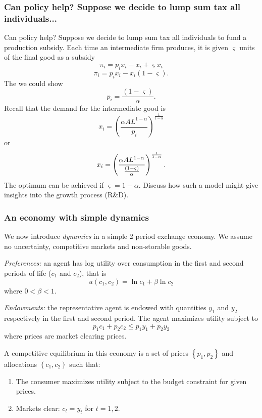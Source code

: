 \documentclass[aspectratio=169]{ltx-talk}
\begin{document}
\begin{frame}
\frametitle{Can policy help? Suppose we decide to lump sum tax all individuals...}
Can policy help? Suppose we decide to lump sum tax all individuals to fund a
production subsidy. Each time an intermediate firm produces, it is given $%
\varsigma $ units of the final good as a subsidy 
\begin{equation*}
\pi _{i}=p_{i}x_{i}-x_{i}+\varsigma x_{i}
\end{equation*}%
\begin{equation*}
\pi _{i}=p_{i}x_{i}-x_{i}\left( 1-\varsigma \right) .
\end{equation*}%
The we could show 
\begin{equation*}
p_{i}=\frac{\left( 1-\varsigma \right) }{\alpha }.
\end{equation*}%
Recall that the demand for the intermediate good is 
\begin{equation*}
x_{i}=\left( \frac{\alpha AL^{1-\alpha }}{p_{i}}\right) ^{\frac{1}{1-\alpha }%
}
\end{equation*}%
or%
\begin{equation*}
x_{i}=\left( \frac{\alpha AL^{1-\alpha }}{\frac{\left( 1-\varsigma \right) }{%
\alpha }}\right) ^{\frac{1}{1-\alpha }}.
\end{equation*}%
The optimum can be achieved if $\varsigma =1-\alpha .$ Discuss how such a
model might give insights into the growth process (R\&D).
\end{frame}

\begin{frame}
\frametitle{An economy with simple dynamics}
We now introduce \textit{dynamics} in a simple 2 period exchange economy. We
assume no uncertainty, competitive markets and non-storable goods.

\textit{Preferences: }an agent has log utility over consumption in the first
and second periods of life ($c_{1}$ and $c_{2}$), that is 
\begin{equation*}
u\left( c_{1},c_{2}\right) =\ln c_{1}+\beta \ln c_{2}
\end{equation*}%
where $0<\beta <1.$

\textit{Endowments:} the representative agent is endowed with quantities $%
y_{1}$ and $y_{2}$ respectively in the first and second period. The agent
maximizes utility subject to%
\begin{equation*}
p_{1}c_{1}+p_{2}c_{2}\leq p_{1}y_{1}+p_{2}y_{2}
\end{equation*}%
where prices are market clearing prices.

A competitive equilibrium in this economy is a set of prices $\left\{
p_{1},p_{2}\right\} $ and allocations $\left\{ c_{1},c_{2}\right\} $ such
that:

\begin{enumerate}
\item The consumer maximizes utility subject to the budget constraint for
given prices.

\item Markets clear: $c_{t}=y_{t}$ for $t=1,2$.
\end{enumerate}
\end{frame}
\end{document}
